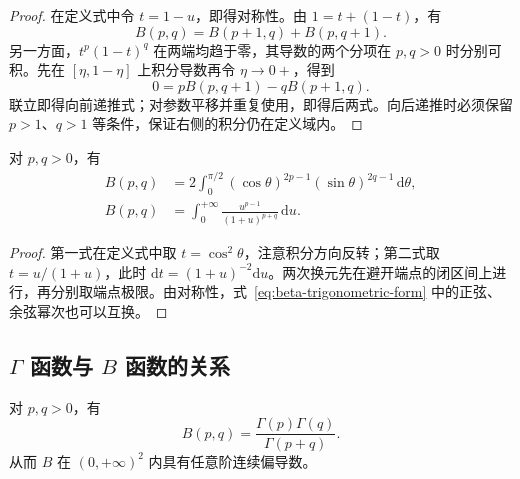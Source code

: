 \documentclass[UTF8,12pt,a4paper,fontset=fandol]{ctexbook}
\begin{document}
\begin{proof}
在定义式中令 $t=1-u$，即得对称性。由 $1=t+(1-t)$，有
\[
    B(p,q)=B(p+1,q)+B(p,q+1).
\]
另一方面，$t^p(1-t)^q$ 在两端均趋于零，其导数的两个分项在 $p,q>0$ 时分别可积。先在 $[\eta,1-\eta]$ 上积分导数再令 $\eta\to0+$，得到
\[
    0=pB(p,q+1)-qB(p+1,q).
\]
联立即得向前递推式；对参数平移并重复使用，即得后两式。向后递推时必须保留 $p>1$、$q>1$ 等条件，保证右侧的积分仍在定义域内。
\end{proof}

\begin{proposition}[三角形式与无穷积分形式]
\label{prop:beta-alternative-integrals}
对 $p,q>0$，有
\begin{align}
    B(p,q)&=2\int_0^{\pi/2}
       (\cos\theta)^{2p-1}(\sin\theta)^{2q-1}\,\mathrm{d}\theta,
       \label{eq:beta-trigonometric-form}\\
    B(p,q)&=\int_0^{+\infty}
       \frac{u^{p-1}}{(1+u)^{p+q}}\,\mathrm{d}u.
       \label{eq:beta-infinite-form}
\end{align}
\end{proposition}

\begin{proof}
第一式在定义式中取 $t=\cos^2\theta$，注意积分方向反转；第二式取 $t=u/(1+u)$，此时 $\mathrm{d}t=(1+u)^{-2}\mathrm{d}u$。两次换元先在避开端点的闭区间上进行，再分别取端点极限。由对称性，式~\eqref{eq:beta-trigonometric-form} 中的正弦、余弦幂次也可以互换。
\end{proof}

\subsection{\texorpdfstring{$\Gamma$}{Gamma} 函数与 \texorpdfstring{$B$}{B} 函数的关系}
\label{subsec:relation-between-gamma-and-beta-functions}

\begin{theorem}[贝塔--伽马关系]
\label{thm:beta-gamma-relation}
对 $p,q>0$，有
\begin{equation}
    B(p,q)=\frac{\Gamma(p)\Gamma(q)}{\Gamma(p+q)}.
    \label{eq:beta-gamma-relation}
\end{equation}
从而 $B$ 在 $(0,+\infty)^2$ 内具有任意阶连续偏导数。
\end{theorem}
\end{document}
